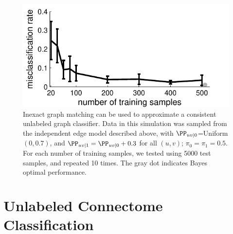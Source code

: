 \documentclass[10pt,journal,cspaper,compsoc]{IEEEtran}
\begin{document}
\begin{figure}[htbp]
	\centering
		\includegraphics[width=1.0\linewidth]{../figs/hetero_easy_n10_MC5000_QAP_vs_n.pdf}
	\caption{Inexact graph matching can be used to approximate a consistent unlabeled graph classifier.  Data in this simulation was sampled from the independent edge model described above, with $\PP_{uv|0}$=Uniform$(0,0.7)$, and $\PP_{uv|1}=\PP_{uv|0}+0.3$ for all $(u,v)$; $\pi_0=\pi_1=0.5$.  For each number of training samples, we tested using 5000 test samples, and repeated 10 times.  The gray dot indicates Bayes optimal performance.}
	\label{fig:1}
\end{figure}





\section{Unlabeled Connectome Classification} %
\label{sub:connectome_classification}
\end{document}
